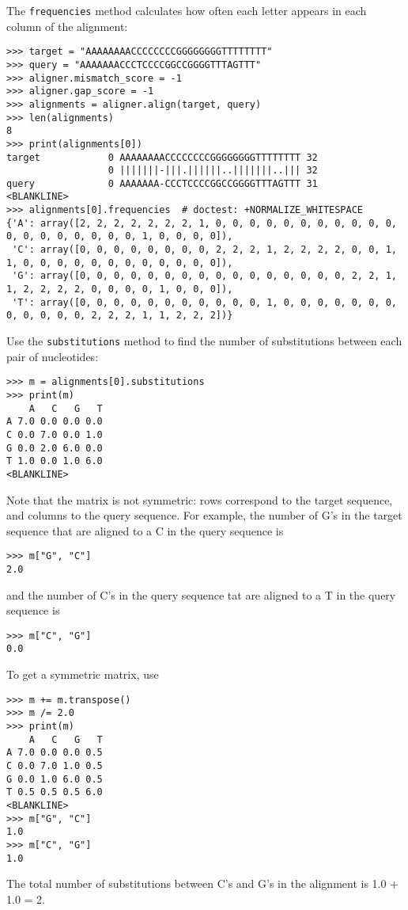 The \verb+frequencies+ method calculates how often each letter appears in each column of the alignment:
\begin{verbatim}
>>> target = "AAAAAAAACCCCCCCCGGGGGGGGTTTTTTTT"
>>> query = "AAAAAAACCCTCCCCGGCCGGGGTTTAGTTT"
>>> aligner.mismatch_score = -1
>>> aligner.gap_score = -1
>>> alignments = aligner.align(target, query)
>>> len(alignments)
8
>>> print(alignments[0])
target            0 AAAAAAAACCCCCCCCGGGGGGGGTTTTTTTT 32
                  0 |||||||-|||.||||||..|||||||..||| 32
query             0 AAAAAAA-CCCTCCCCGGCCGGGGTTTAGTTT 31
<BLANKLINE>
>>> alignments[0].frequencies  # doctest: +NORMALIZE_WHITESPACE
{'A': array([2, 2, 2, 2, 2, 2, 2, 1, 0, 0, 0, 0, 0, 0, 0, 0, 0, 0, 0, 0, 0, 0, 0, 0, 0, 0, 0, 1, 0, 0, 0, 0]),
 'C': array([0, 0, 0, 0, 0, 0, 0, 0, 2, 2, 2, 1, 2, 2, 2, 2, 0, 0, 1, 1, 0, 0, 0, 0, 0, 0, 0, 0, 0, 0, 0, 0]),
 'G': array([0, 0, 0, 0, 0, 0, 0, 0, 0, 0, 0, 0, 0, 0, 0, 0, 2, 2, 1, 1, 2, 2, 2, 2, 0, 0, 0, 0, 1, 0, 0, 0]),
 'T': array([0, 0, 0, 0, 0, 0, 0, 0, 0, 0, 0, 1, 0, 0, 0, 0, 0, 0, 0, 0, 0, 0, 0, 0, 2, 2, 2, 1, 1, 2, 2, 2])}
\end{verbatim}
Use the \verb+substitutions+ method to find the number of substitutions between each pair of nucleotides:
\begin{verbatim}
>>> m = alignments[0].substitutions
>>> print(m)
    A   C   G   T
A 7.0 0.0 0.0 0.0
C 0.0 7.0 0.0 1.0
G 0.0 2.0 6.0 0.0
T 1.0 0.0 1.0 6.0
<BLANKLINE>
\end{verbatim}

Note that the matrix is not symmetric: rows correspond to the target sequence, and columns to the query sequence.  For example, the number of G's in the target sequence that are aligned to a C in the query sequence is
\begin{verbatim}
>>> m["G", "C"]
2.0
\end{verbatim}
and the number of C's in the query sequence tat are aligned to a T in the query sequence is
\begin{verbatim}
>>> m["C", "G"]
0.0
\end{verbatim}
To get a symmetric matrix, use
\begin{verbatim}
>>> m += m.transpose()
>>> m /= 2.0
>>> print(m)
    A   C   G   T
A 7.0 0.0 0.0 0.5
C 0.0 7.0 1.0 0.5
G 0.0 1.0 6.0 0.5
T 0.5 0.5 0.5 6.0
<BLANKLINE>
>>> m["G", "C"]
1.0
>>> m["C", "G"]
1.0
\end{verbatim}
The total number of substitutions between C's and G's in the alignment is 1.0 + 1.0 = 2.


